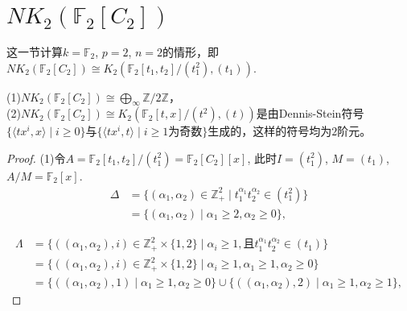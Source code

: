 \section{$NK_2(\mathbb{F}_2[C_2])$} %
这一节计算$k=\mathbb{F}_2$, $p=2$, $n=2$的情形，即$NK_2(\mathbb{F}_2[C_2])\cong K_2(\mathbb{F}_2[t_1,t_2]/(t_1^2),(t_1))$.
\begin{theorem}
	(1)$NK_2(\mathbb{F}_2[C_2])\cong \bigoplus_{\infty} \mathbb{Z}/2 \mathbb{Z}$，\\
	(2)$NK_2(\mathbb{F}_2[C_2])\cong K_2(\mathbb{F}_2[t,x]/(t^2),(t))$是由Dennis-Stein符号$\{\langle tx^i,x \rangle \mid i\geq 0\}$与$\{\langle tx^i,t \rangle \mid i\geq 1\text{为奇数}\}$生成的，这样的符号均为$2$阶元。
\end{theorem}
\begin{proof}
	(1)令$A=\mathbb{F}_2[t_1,t_2]/(t_1^2)=\mathbb{F}_2[C_{2}][x]$, 此时$I=(t_1^2)$, $M=(t_1)$, $A/M=\mathbb{F}_2[x]$. 
\begin{align*}
\Delta &=\{(\alpha_1,\alpha_2)\in\mathbb{Z}_+^2\mid  t_1^{\alpha_1}t_2^{\alpha_2}\in (t_1^2)\}\\
	&=\{(\alpha_1,\alpha_2)\mid \alpha_1\geq 2, \alpha_2 \geq 0\},
\end{align*}

\begin{align*}
\Lambda &=\{((\alpha_1,\alpha_2),i)\in\mathbb{Z}_+^2 \times \{1,2\}\mid \alpha_i\geq 1, \text{且} t_1^{\alpha_1}t_2^{\alpha_2}\in (t_1)\} \\
	&=\{((\alpha_1,\alpha_2),i)\in\mathbb{Z}_+^2 \times \{1,2\}\mid \alpha_i\geq 1, \alpha_1\geq 1, \alpha_2\geq 0\} \\
	&=\{((\alpha_1,\alpha_2),1) \mid \alpha_1\geq 1, \alpha_2\geq 0\}\cup \{((\alpha_1,\alpha_2),2) \mid \alpha_1\geq 1, \alpha_2\geq 1\},
\end{align*}


\end{proof}
